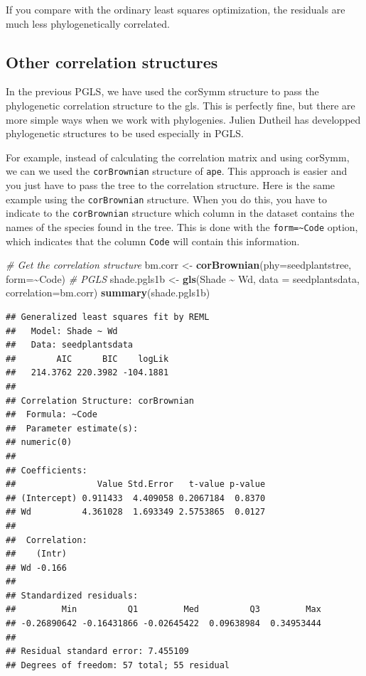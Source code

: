 \documentclass[
]{book}
\newenvironment{Shaded}{\begin{snugshade}}{\end{snugshade}}
\newcommand{\AttributeTok}[1]{\textcolor[rgb]{0.13,0.29,0.53}{#1}}
\newcommand{\CommentTok}[1]{\textcolor[rgb]{0.56,0.35,0.01}{\textit{#1}}}
\newcommand{\FunctionTok}[1]{\textcolor[rgb]{0.13,0.29,0.53}{\textbf{#1}}}
\newcommand{\NormalTok}[1]{#1}
\newcommand{\OtherTok}[1]{\textcolor[rgb]{0.56,0.35,0.01}{#1}}
\newcommand{\SpecialCharTok}[1]{\textcolor[rgb]{0.81,0.36,0.00}{\textbf{#1}}}
\begin{document}
If you compare with the ordinary least squares optimization, the residuals are much less phylogenetically correlated.

\subsection{Other correlation structures}\label{other-correlation-structures}

In the previous PGLS, we have used the corSymm structure to pass the phylogenetic correlation structure to the gls. This is perfectly fine, but there are more simple ways when we work with phylogenies. Julien Dutheil has developped phylogenetic structures to be used especially in PGLS.

For example, instead of calculating the correlation matrix and using corSymm, we can we used the \texttt{corBrownian} structure of \texttt{ape}. This approach is easier and you just have to pass the tree to the correlation structure. Here is the same example using the \texttt{corBrownian} structure. When you do this, you have to indicate to the \texttt{corBrownian} structure which column in the dataset contains the names of the species found in the tree. This is done with the \texttt{form=\textasciitilde{}Code} option, which indicates that the column \texttt{Code} will contain this information.

\begin{Shaded}
\begin{Highlighting}[]
\CommentTok{\# Get the correlation structure}
\NormalTok{bm.corr }\OtherTok{\textless{}{-}} \FunctionTok{corBrownian}\NormalTok{(}\AttributeTok{phy=}\NormalTok{seedplantstree, }\AttributeTok{form=}\SpecialCharTok{\textasciitilde{}}\NormalTok{Code)}
\CommentTok{\# PGLS}
\NormalTok{shade.pgls1b }\OtherTok{\textless{}{-}} \FunctionTok{gls}\NormalTok{(Shade }\SpecialCharTok{\textasciitilde{}}\NormalTok{ Wd, }\AttributeTok{data =}\NormalTok{ seedplantsdata, }\AttributeTok{correlation=}\NormalTok{bm.corr)}
\FunctionTok{summary}\NormalTok{(shade.pgls1b)}
\end{Highlighting}
\end{Shaded}

\begin{verbatim}
## Generalized least squares fit by REML
##   Model: Shade ~ Wd 
##   Data: seedplantsdata 
##        AIC      BIC    logLik
##   214.3762 220.3982 -104.1881
## 
## Correlation Structure: corBrownian
##  Formula: ~Code 
##  Parameter estimate(s):
## numeric(0)
## 
## Coefficients:
##                Value Std.Error   t-value p-value
## (Intercept) 0.911433  4.409058 0.2067184  0.8370
## Wd          4.361028  1.693349 2.5753865  0.0127
## 
##  Correlation: 
##    (Intr)
## Wd -0.166
## 
## Standardized residuals:
##         Min          Q1         Med          Q3         Max 
## -0.26890642 -0.16431866 -0.02645422  0.09638984  0.34953444 
## 
## Residual standard error: 7.455109 
## Degrees of freedom: 57 total; 55 residual
\end{verbatim}
\end{document}
